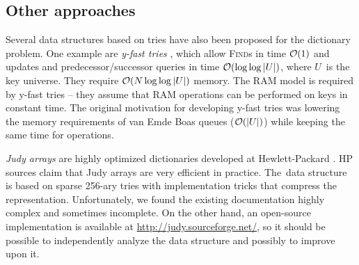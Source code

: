 \subsection{Other approaches}
Several data structures based on tries have also been proposed for the
dictionary problem. One example are \emph{y-fast tries} \cite{y-fast},
which allow \textsc{Find}s in time $\mathcal{O}(1)$ and updates and predecessor/successor
queries in time $\mathcal{O}(\log\log |U|)$, where $U$~is the key universe. They require
$\mathcal{O}(N \log\log |U|)$ memory.
The RAM model is required by y-fast tries -- they assume that RAM operations
can be performed on keys in constant time.
The original motivation for developing y-fast tries was lowering the memory
requirements of van Emde Boas queues ($\mathcal{O}(|U|)$) while keeping the same time
for operations.

\emph{Judy arrays} are highly optimized dictionaries developed at
Hewlett-Packard \cite{judy-shop-manual, judy-patent}.
HP sources claim that Judy arrays are very efficient in practice.
The~data structure is based on sparse 256-ary tries with implementation tricks
that compress the representation.
Unfortunately, we found the existing documentation highly complex and sometimes
incomplete. On the other hand, an open-source implementation is available
at \url{http://judy.sourceforge.net/}, so it should be possible to independently
analyze the data structure and possibly to improve upon it.
